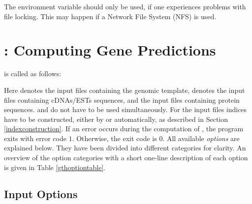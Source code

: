 \documentclass[11pt,a4paper,titlepage]{article}
\begin{document}
The  environment variable should only be used,
if one experiences problems with file locking. This may happen if a Network
File System (NFS) is used.

\section{\Callgth: Computing Gene Predictions}
\label{gthsection}

\Callgth is called as follows:

\medskip
{}  \Showoptionarg{\genseqindex}  \Showoptionarg{\cdnaindex}  \Showoptionarg{\proteinindex}
\medskip

Here \Showoptionarg{\genseqindex} denotes the input files containing the genomic
template, \Showoptionarg{\cdnaindex} denotes the input files containing
cDNAs/ESTs sequences, and \Showoptionarg{\proteinindex} the input files
containing protein sequences.  and  do not
have to be used simultaneously.  For the input files indices have to be
constructed, either by \callmkvtree or automatically, as described in Section
\ref{indexconstruction}.
If an error occurs during the computation of \Gth, the program exits with
 error code $1$. Otherwise, the exit code is $0$.
All available \textit{options} are explained below. They have been divided into different categories for clarity.
An overview
of the option categories with a short one-line description of each
option is given in Table \ref{gthoptiontable}.


\begin{center}
\label{gthoptiontable}
\begin{scriptsize}

\end{scriptsize}
\end{center}





\subsection{Input Options}
\begin{Justshowoptions}
\end{Justshowoptions}
\end{document}
